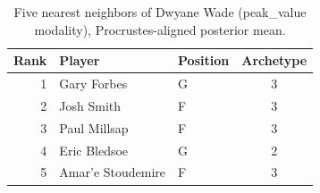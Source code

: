 \begin{table}[htbp]
  \centering\small
  \begin{tabular}{rllc}
    \toprule
    Rank & Player & Position & Archetype \\
    \midrule
    1 & Gary Forbes & G & 3 \\
    2 & Josh Smith & F & 3 \\
    3 & Paul Millsap & F & 3 \\
    4 & Eric Bledsoe & G & 2 \\
    5 & Amar'e Stoudemire & F & 3 \\
    \bottomrule
  \end{tabular}
  \caption{Five nearest neighbors of Dwyane Wade (peak_value modality), Procrustes-aligned posterior mean.}
  \label{tab:Dwyane_Wade_neighbors_peak_value}
\end{table}


